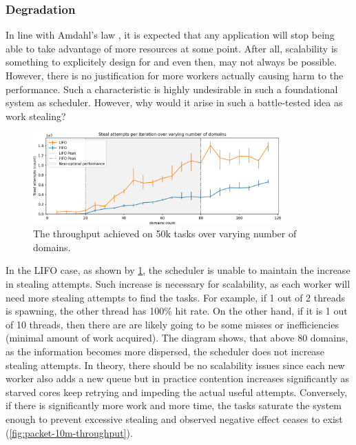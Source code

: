 \documentclass[12pt,a4paper,twoside]{report}
\begin{document}
\subsubsection{Degradation}
\label{section:degradation}
In line with Amdahl's law \cite{amdahl}, it is expected that any application will stop being able to take advantage of more resources at some point. After all, scalability is something to explicitely design for and even then, may not always be possible. However, there is no justification for more workers actually causing harm to the performance. Such a characteristic is highly undesirable in such a foundational system as scheduler. However, why would it arise in such a battle-tested idea as work stealing? 

\begin{figure} 
     \centering
     \includegraphics[width=0.85\textwidth]{eval/packet-basic-with-steal-counts2.png}
     \caption{The throughput achieved on 50k tasks over varying number of domains.}
    \label{fig:packet-with-steal-counts}
\end{figure}

In the LIFO case, as shown by \ref{fig:packet-with-steal-counts}, the scheduler is unable to maintain the increase in stealing attempts. Such increase is necessary for scalability, as each worker will need more stealing attempts to find the tasks. For example, if 1 out of 2 threads is spawning, the other thread has 100\% hit rate. On the other hand, if it is 1 out of 10 threads, then there are are likely going to be some misses or inefficiencies (minimal amount of work acquired). The diagram shows, that above 80 domains, as the information becomes more dispersed, the scheduler does not increase stealing attempts. In theory, there should be no scalability issues since each new worker also adds a new queue but in practice contention increases significantly as starved cores keep retrying and impeding the actual useful attempts. Conversely, if there is significantly more work and more time, the tasks saturate the system enough to prevent excessive stealing and observed negative effect ceases to exist (\ref{fig:packet-10m-throughput}).
\end{document}
